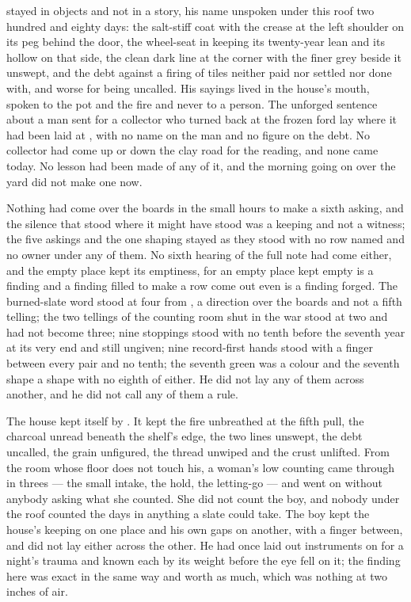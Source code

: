  stayed in objects and not in a story, his name unspoken under this roof two hundred and eighty days: the salt-stiff coat with the crease at the left shoulder on its peg behind the door, the wheel-seat in  keeping its twenty-year lean and its hollow on that side, the clean dark line at the corner with the finer grey beside it unswept, and the debt against a firing of tiles neither paid nor settled nor done with, and worse for being uncalled. His sayings lived in the house’s mouth, spoken to the pot and the fire and never to a person. The unforged sentence about a man sent for a collector who turned back at the frozen ford lay where it had been laid at , with no name on the man and no figure on the debt. No collector had come up or down the clay road for the reading, and none came today. No lesson had been made of any of it, and the morning going on over the yard did not make one now.

Nothing had come over the boards in the small hours to make a sixth asking, and the silence that stood where it might have stood was a keeping and not a witness; the five askings and the one shaping stayed as they stood with no row named and no owner under any of them. No sixth hearing of the full note had come either, and the empty place kept its emptiness, for an empty place kept empty is a finding and a finding filled to make a row come out even is a finding forged. The burned-slate word stood at four from , a direction over the boards and not a fifth telling; the two tellings of the counting room shut in the war stood at two and had not become three; nine stoppings stood with no tenth before the seventh year at its very end and still ungiven; nine record-first hands stood with a finger between every pair and no tenth; the seventh green was a colour and the seventh shape a shape with no eighth of either. He did not lay any of them across another, and he did not call any of them a rule.

The house kept itself by . It kept the fire unbreathed at the fifth pull, the charcoal unread beneath the shelf’s edge, the two lines unswept, the debt uncalled, the grain unfigured, the thread unwiped and the crust unlifted. From the room whose floor does not touch his, a woman’s low counting came through in threes --- the small intake, the hold, the letting-go --- and went on without anybody asking what she counted. She did not count the boy, and nobody under the roof counted the days in anything a slate could take. The boy kept the house’s keeping on one place and his own gaps on another, with a finger between, and did not lay either across the other. He had once laid out instruments on  for a night’s trauma and known each by its weight before the eye fell on it; the finding here was exact in the same way and worth as much, which was nothing at two inches of air.

